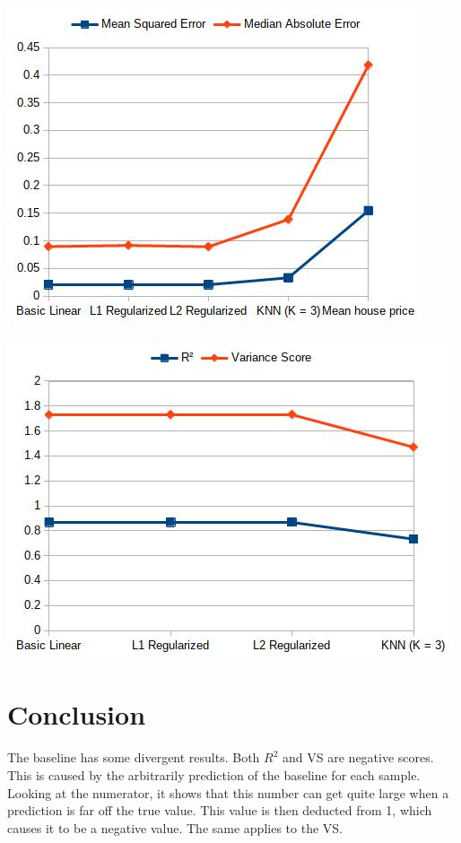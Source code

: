\documentclass[a4paper,11pt]{article}
\begin{document}
\begin{center}
\begin{minipage}{0.49\linewidth}
\includegraphics[width=\linewidth]{images/errors.jpg}
\end{minipage}
\hfill
\begin{minipage}{0.49\linewidth}
\includegraphics[width=\linewidth]{images/scores.jpg}
\end{minipage}
      \hfill %
\end{center}




\section{Conclusion}
The baseline has some divergent results. Both $R^2$ and VS are negative scores. This is caused by the arbitrarily prediction of the baseline for each sample. Looking at the numerator, it shows that this number can get quite large when a prediction is far off the true value. This value is then deducted from 1, which causes it to be a negative value. The same applies to the VS.\\
\end{document}
